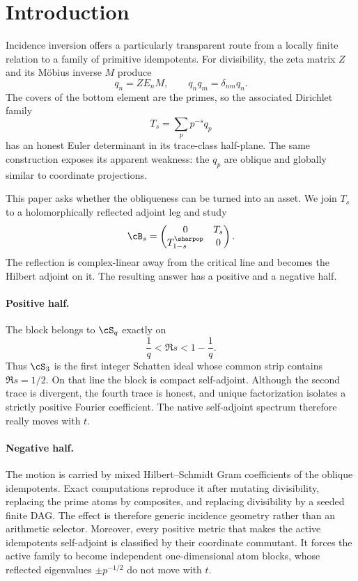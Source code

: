 \section{Introduction}
\label{sec:introduction}

Incidence inversion offers a particularly transparent route from a
locally finite relation to a family of primitive idempotents.  For
divisibility, the zeta matrix $Z$ and its M\"obius inverse $M$ produce
\[
  q_n=ZE_nM,\qquad q_nq_m=\delta_{nm}q_n.
\]
The covers of the bottom element are the primes, so the associated
Dirichlet family
\[
  T_s=\sum_p p^{-s}q_p
\]
has an honest Euler determinant in its trace-class half-plane.  The
same construction exposes its apparent weakness: the $q_p$ are
oblique and globally similar to coordinate projections.

This paper asks whether the obliqueness can be turned into an asset.
We join $T_s$ to a holomorphically reflected adjoint leg and study
\[
  \cB_s=
  \begin{pmatrix}0&T_s\\T_{1-s}^{\sharpop}&0\end{pmatrix}.
\]
The reflection is complex-linear away from the critical line and
becomes the Hilbert adjoint on it.  The resulting answer has a
positive and a negative half.

\paragraph{Positive half.}
The block belongs to $\cS_q$ exactly on
\[
  \frac1q<\Re s<1-\frac1q.
\]
Thus $\cS_3$ is the first integer Schatten ideal whose common strip
contains $\Re s=1/2$.  On that line the block is compact self-adjoint.
Although the second trace is divergent, the fourth trace is honest,
and unique factorization isolates a strictly positive Fourier
coefficient.  The native self-adjoint spectrum therefore really moves
with $t$.

\paragraph{Negative half.}
The motion is carried by mixed Hilbert--Schmidt Gram coefficients of
the oblique idempotents.  Exact computations reproduce it after
mutating divisibility, replacing the prime atoms by composites, and
replacing divisibility by a seeded finite DAG.  The effect is therefore
generic incidence geometry rather than an arithmetic selector.
Moreover, every positive metric that makes the active idempotents
self-adjoint is classified by their coordinate commutant.  It forces
the active family to become independent one-dimensional atom blocks,
whose reflected eigenvalues $\pm p^{-1/2}$ do not move with $t$.

